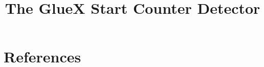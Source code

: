 \documentclass[review,twocolumn,3p]{elsarticle}
\begin{document}
\begin{frontmatter}
\title{The GlueX Start Counter Detector}	



\end{frontmatter}

\linenumbers
%


%
%
%
%
%

\section*{References}

\end{document}
